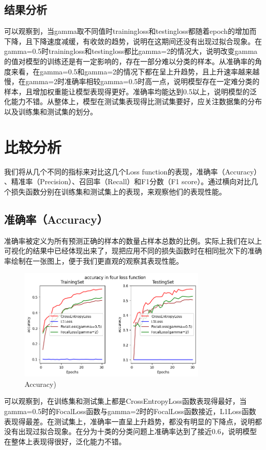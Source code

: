\documentclass{article}
\begin{document}
\subsection{结果分析}
可以观察到，当gamma取不同值时trainingloss和testingloss都随着epoch的增加而下降，且下降速度减缓，有收敛的趋势，说明在这期间还没有出现过拟合现象。在gamma=0.5时trainingloss和testingloss都比gamma=2的情况大，说明改变gamma的值对模型的训练还是有一定影响的，存在一部分难以分类的样本。从准确率的角度来看，在gamma=0.5和gamma=2的情况下都在呈上升趋势，且上升速率越来越慢，在gamma=2时准确率相较gamma=0.5时高一点，说明模型存在一定难分类的样本，且增加权重能让模型表现得更好。准确率均能达到0.5以上，说明模型的泛化能力不错。从整体上，模型在测试集表现得比测试集要好，应关注数据集的分布以及训练集和测试集的划分。

\section{比较分析}
我们将从几个不同的指标来对比这几个Loss function的表现，准确率（Accuracy）
、精准率（Precision）、召回率（Recall）和F1分数（F1 score）。通过横向对比几个损失函数分别在训练集和测试集上的表现，来观察他们的表现性能。
\subsection{准确率（Accuracy）}
准确率被定义为所有预测正确的样本的数量占样本总数的比例。实际上我们在以上可视化的结果中已经体现出来了，现把应用不同的损失函数时在相同批次下的准确率绘制在一张图上，便于我们更直观的观察其表现性能。
\begin{figure}[H]
    \centering
    \includegraphics[width=0.8\textwidth]{Figure/Accuracy.png}
    \caption{Accuracy)}
    \label{fig:Accuracy}
\end{figure}
可以观察到，在训练集和测试集上都是CrossEntropyLoss函数表现得最好，当gamma=0.5时的FocalLoss函数与gamma=2时的FocalLoss函数接近，L1Loss函数表现得最差。在测试集上，准确率一直呈上升趋势，都没有明显的下降点，说明都没有出现过拟合现象。在分为十类的分类问题上准确率达到了接近0.6，说明模型在整体上表现得很好，泛化能力不错。
\end{document}
